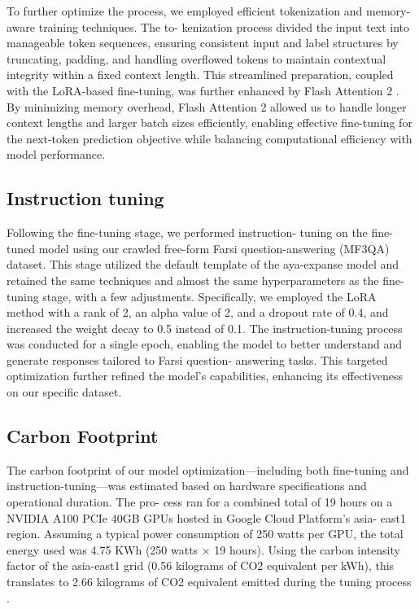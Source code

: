 \documentclass[conference]{IEEEtran}
\begin{document}
	To further optimize the process, we employed efficient
	tokenization and memory-aware training techniques. The to-
	kenization process divided the input text into manageable
	token sequences, ensuring consistent input and label structures
	by truncating, padding, and handling overflowed tokens to
	maintain contextual integrity within a fixed context length.
	This streamlined preparation, coupled with the LoRA-based
	fine-tuning, was further enhanced by Flash Attention 2 
	\cite{b29}.
	By minimizing memory overhead, Flash Attention 2 allowed
	us to handle longer context lengths and larger batch sizes
	efficiently, enabling effective fine-tuning for the next-token
	prediction objective while balancing computational efficiency
	with model performance.
	\subsection{Instruction tuning}
	Following the fine-tuning stage, we performed instruction-
	tuning on the fine-tuned model using our crawled free-form
	Farsi question-answering (MF3QA) dataset. This stage utilized
	the default template of the aya-expanse model and retained
	the same techniques and almost the same hyperparameters as
	the fine-tuning stage, with a few adjustments. Specifically, we
	employed the LoRA method with a rank of 2, an alpha value
	of 2, and a dropout rate of 0.4, and increased the weight
	decay to 0.5 instead of 0.1. The instruction-tuning process
	was conducted for a single epoch, enabling the model to better
	understand and generate responses tailored to Farsi question-
	answering tasks. This targeted optimization further refined the
	model’s capabilities, enhancing its effectiveness on our specific
	dataset.
	\subsection{Carbon Footprint}
	The carbon footprint of our model optimization—including
	both fine-tuning and instruction-tuning—was estimated based
	on hardware specifications and operational duration. The pro-
	cess ran for a combined total of 19 hours on a NVIDIA A100
	PCIe 40GB GPUs hosted in Google Cloud Platform’s asia-
	east1 region. Assuming a typical power consumption of 250
	watts per GPU, the total energy used was 4.75 KWh (250
	watts × 19 hours). Using the carbon intensity factor of the
	asia-east1 grid (0.56 kilograms of CO2 equivalent per kWh),
	this translates to 2.66 kilograms of CO2 equivalent emitted
	during the tuning process
	\cite{b30}.
\end{document}
